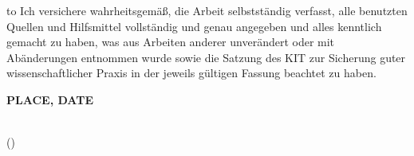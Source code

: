
\thispagestyle{empty}
\null\vfill
\noindent\hbox to \textwidth{\hrulefill} 
%
% 
%
{Ich versichere wahrheitsgemäß, die Arbeit selbstständig verfasst, alle benutzten 
Quellen und Hilfsmittel vollständig und genau angegeben und alles kenntlich gemacht 
zu haben, was aus Arbeiten anderer unverändert oder mit Abänderungen entnommen wurde 
sowie die Satzung des KIT zur Sicherung guter wissenschaftlicher Praxis in der 
jeweils gültigen Fassung beachtet zu haben. }
 
 
\textbf{PLACE, DATE}
\vspace{1.5cm}
 
\dotfill\hspace*{8.0cm}\\
\hspace*{2cm}(\theauthor) 
\cleardoublepage